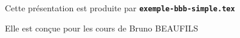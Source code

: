   \item Cette présentation est produite par \texttt{\textbf{exemple-bbb-simple.tex}}
  \item Elle est conçue pour les cours de Bruno BEAUFILS
